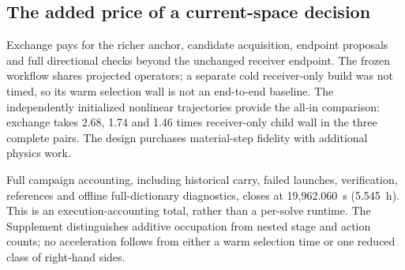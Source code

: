 \subsection{The added price of a current-space decision}
Exchange pays for the richer anchor, candidate acquisition, endpoint proposals and full directional checks beyond the unchanged receiver endpoint. The frozen workflow shares projected operators; a separate cold receiver-only build was not timed, so its warm selection wall is not an end-to-end baseline. The independently initialized nonlinear trajectories provide the all-in comparison: exchange takes 2.68, 1.74 and 1.46 times receiver-only child wall in the three complete pairs. The design purchases material-step fidelity with additional physics work.

Full campaign accounting, including historical carry, failed launches, verification, references and offline full-dictionary diagnostics, closes at 19,962.060~s (5.545~h). This is an execution-accounting total, rather than a per-solve runtime. The Supplement distinguishes additive occupation from nested stage and action counts; no acceleration follows from either a warm selection time or one reduced class of right-hand sides.
